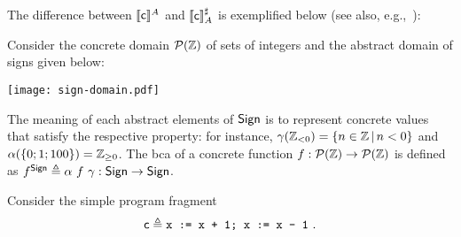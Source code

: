 The difference between $\llbracket\mathsf{c}\rrbracket^{A}$ and $\llbracket\mathsf{c}\rrbracket^{\sharp}_{A}$ is exemplified below (see also, e.g.,~\cite[Example~1]{LL09}):
\begin{example}\label{ex:lcla:ext-vs-int}
	Consider the concrete domain $\mathcal{P}(\mathbb{Z})$ of sets of integers and the abstract domain of signs given below:
	\begin{center}
%			
%			
		\texttt{[image: sign-domain.pdf]}
	\end{center}
	The meaning of each abstract elements of $\mathsf{Sign}$ is to represent concrete values that satisfy the respective property: for instance, $\gamma(\mathbb{Z}_{< 0}) = \{ n \in \mathbb{Z} \,\vert\, n < 0 \}$ and $\alpha( \{ 0; 1; 100 \}) = \mathbb{Z}_{\ge 0}$.
	The bca of a concrete function $f: \mathcal{P}(\mathbb{Z}) \to \mathcal{P}(\mathbb{Z})$ is defined as $f^{\mathsf{Sign}}\triangleq \alpha~f~\gamma: \mathsf{Sign} \to \mathsf{Sign}$.
	
	Consider the simple program fragment 
	$$\regc \eqdef \code{x := x + 1; x := x - 1}\ .$$
	

\end{example}
